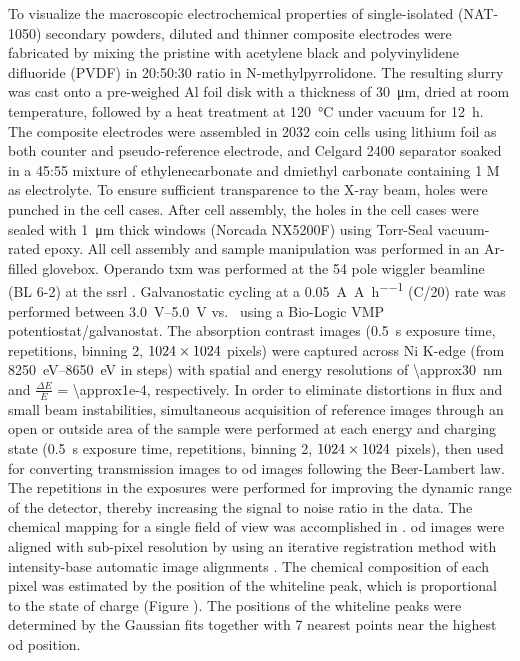 \documentclass{article}
\begin{document}
To visualize the macroscopic electrochemical properties of
single-isolated \nca{} (NAT-1050) secondary powders, diluted and
thinner composite electrodes were fabricated by mixing the pristine
\nca{} with acetylene black and polyvinylidene difluoride (PVDF) in
20:50:30 ratio in N-methylpyrrolidone. The resulting slurry was cast
onto a pre-weighed Al foil disk with a thickness of
\SI{30}{\micro\meter}, dried at room temperature, followed by a heat
treatment at \SI{120}{\celsius} under vacuum for \SI{12}{\hour}. The
composite electrodes were assembled in  2032 coin cells using lithium foil as both counter
and pseudo-reference electrode, and Celgard 2400 separator soaked in a
45:55 mixture of ethylenecarbonate and dmiethyl carbonate containing 1
M  as electrolyte. To ensure sufficient transparence to the
X-ray beam, holes were punched in the cell cases. After cell assembly,
the holes in the cell cases were sealed with \SI{1}{\micro\meter}
thick  windows (Norcada NX5200F) using Torr-Seal
vacuum-rated epoxy. All cell assembly and sample manipulation was
performed in an Ar-filled glovebox. Operando \gls{txm} was performed
at the 54 pole wiggler beamline (BL 6-2) at the \gls{ssrl}
\cite{yun2008}. Galvanostatic cycling at a
\SI{0.05}{\ampere\per\ampere\per\hour} (C/20) rate was performed
between \SIrange{3.0}{5.0}{\volt} vs.\  using a Bio-Logic
VMP potentiostat/galvanostat. The absorption contrast images
(\SI{0.5}{\second} exposure time,  repetitions,
binning 2, $\rm 1024\times 1024$ pixels) were captured across Ni
K-edge (from \SIrange{8250}{8650}{\electronvolt} in  steps) with spatial and energy resolutions of
\SI{\approx30}{\nano\meter} and $\frac{\Delta E}{E}$ =
\num{\approx1e-4}, respectively. In order to eliminate distortions in
flux and small beam instabilities, simultaneous acquisition of
reference images through an open or outside area of the sample were
performed at each energy and charging state (\SI{0.5}{\second}
exposure time,  repetitions, binning 2, $\rm 1024
\times 1024$ pixels), then used for converting transmission images to
\gls{od} images following the Beer-Lambert law. The repetitions in the
exposures were performed for improving the dynamic range of the
detector, thereby increasing the signal to noise ratio in the
data. The chemical mapping for a single field of view was accomplished
in . \Gls{od} images were aligned with
sub-pixel resolution by using an iterative registration method with
intensity-base automatic image alignments \cite{lee2019-3}. The
chemical composition of each pixel was estimated by the position of
the whiteline peak, which is proportional to the state of charge
(Figure ). The positions of the
whiteline peaks were determined by the Gaussian fits together with 7
nearest points near the highest \gls{od} position.
\end{document}
